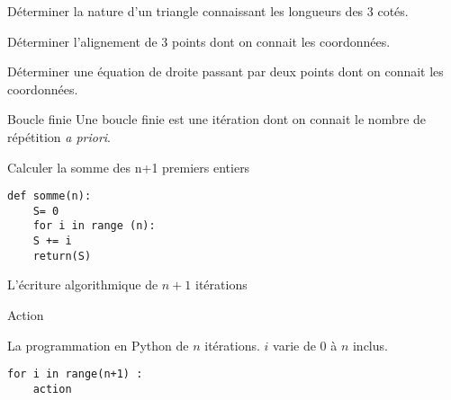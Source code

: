 \begin{ExD}

Déterminer la nature d'un triangle connaissant les longueurs des 3 cotés.
\end{ExD}

\begin{ExD}

Déterminer l'alignement de 3 points dont on connait les coordonnées.
\end{ExD}

\begin{ExD}

Déterminer une équation de droite passant par deux points dont on connait les coordonnées.
\end{ExD}
\newpage

\begin{titre}

\end{titre}
 

\begin{DefT}{Boucle finie}
Une boucle finie est une itération dont on connait le nombre de répétition \textit{a priori}. 
\end{DefT}

\begin{ExC}{Calculer la somme des n+1 premiers entiers}
\begin{lstlisting}
def somme(n):
	S= 0
	for i in range (n):
	S += i
	return(S)
\end{lstlisting}
\end{ExC}



 
\begin{minipage}[t]{0.49\linewidth}
L'écriture algorithmique  de $n+1$ itérations
\begin{algobox}
\DebutPour
\Ligne Action
\FinPour
\end{algobox}

\end{minipage}
\hfill\vrule\hfill
\begin{minipage}[t]{0.49\linewidth}
La programmation en Python de $n$ itérations. $i$ varie de 0 à $n$ inclus.
\begin{lstlisting}
for i in range(n+1) :
	action
\end{lstlisting}
\end{minipage}


